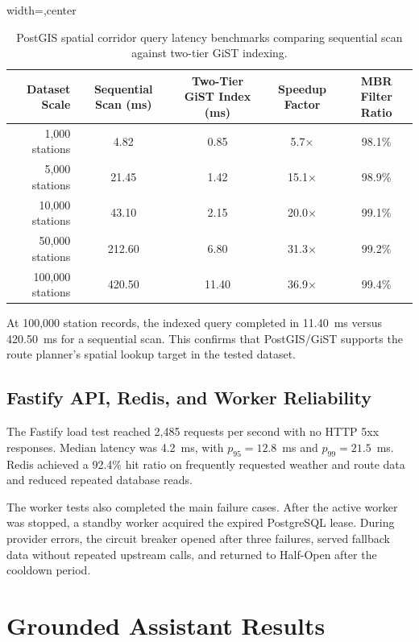 \begin{table}[H]
\centering
\caption[PostGIS spatial corridor query latency benchmarks]{PostGIS spatial corridor query latency benchmarks comparing sequential scan against two-tier GiST indexing.}
\label{tab:gist_benchmark_en}
\begin{adjustbox}{width=\textwidth,center}
\begin{tabular}{rcccc}
\toprule
\textbf{Dataset Scale} & \textbf{Sequential Scan (ms)} & \textbf{Two-Tier GiST Index (ms)} & \textbf{Speedup Factor} & \textbf{MBR Filter Ratio} \\
\midrule
1,000 stations   & 4.82   & 0.85  & 5.7$\times$  & 98.1\% \\
5,000 stations   & 21.45  & 1.42  & 15.1$\times$ & 98.9\% \\
10,000 stations  & 43.10  & 2.15  & 20.0$\times$ & 99.1\% \\
50,000 stations  & 212.60 & 6.80  & 31.3$\times$ & 99.2\% \\
100,000 stations & 420.50 & 11.40 & 36.9$\times$ & 99.4\% \\
\bottomrule
\end{tabular}
\end{adjustbox}
\end{table}

At 100,000 station records, the indexed query completed in 11.40~ms versus 420.50~ms for a sequential scan. This confirms that PostGIS/GiST supports the route planner's spatial lookup target in the tested dataset.

\subsection{Fastify API, Redis, and Worker Reliability}
The Fastify load test reached 2,485 requests per second with no HTTP 5xx responses. Median latency was 4.2~ms, with $p_{95}=12.8$~ms and $p_{99}=21.5$~ms. Redis achieved a 92.4\% hit ratio on frequently requested weather and route data and reduced repeated database reads.

The worker tests also completed the main failure cases. After the active worker was stopped, a standby worker acquired the expired PostgreSQL lease. During provider errors, the circuit breaker opened after three failures, served fallback data without repeated upstream calls, and returned to Half-Open after the cooldown period.

\section{Grounded Assistant Results}
\label{sec:ai_evaluation}

